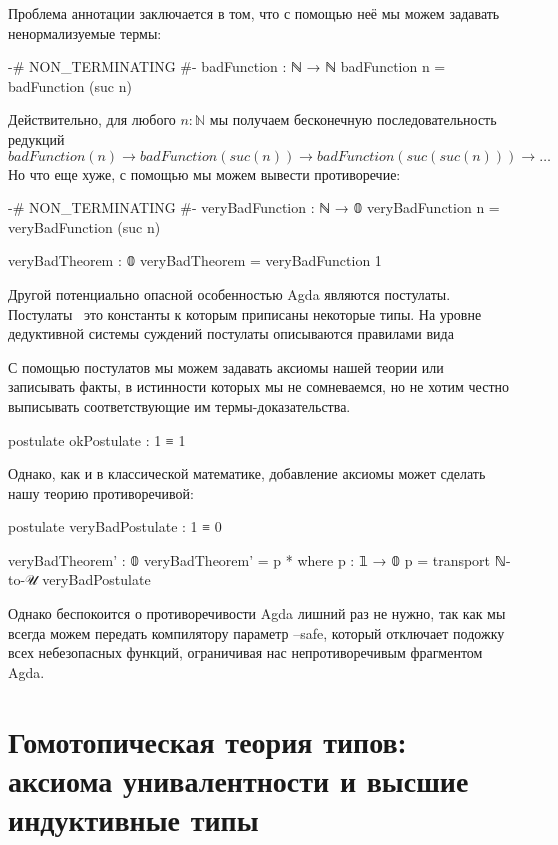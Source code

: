 \documentclass{article}[12pt]
\newcommand{\dash}{\textemdash\ }
\begin{document}
Проблема аннотации  заключается в том, что с помощью неё 
мы можем задавать ненормализуемые термы:
\begin{code}
{-# NON_TERMINATING #-}
badFunction : ℕ → ℕ
badFunction n = badFunction (suc n)
\end{code}
Действительно, для любого $n : \mathbb{N}$ мы получаем бесконечную последовательность редукций
$$badFunction(n) \rightarrow badFunction(suc(n)) \rightarrow badFunction(suc(suc(n))) \rightarrow \dots$$
Но что еще хуже, с помощью  мы можем вывести противоречие:
\begin{code}
{-# NON_TERMINATING #-}
veryBadFunction : ℕ → 𝟘
veryBadFunction n = veryBadFunction (suc n)

veryBadTheorem : 𝟘
veryBadTheorem = veryBadFunction 1
\end{code}

Другой потенциально опасной особенностью Agda являются постулаты. Постулаты \dash это константы к которым
приписаны некоторые типы. На уровне дедуктивной системы суждений постулаты описываются правилами вида
\begin{prooftree}
\end{prooftree}
С помощью постулатов мы можем задавать аксиомы нашей теории или записывать факты, в истинности которых
мы не сомневаемся, но не хотим честно выписывать соответствующие им термы-доказательства.
\begin{code}
postulate
    okPostulate : 1 ≡ 1
\end{code}

Однако, как и в классической математике, добавление аксиомы может сделать нашу теорию противоречивой:
\begin{code}
postulate
    veryBadPostulate : 1 ≡ 0

veryBadTheorem' : 𝟘
veryBadTheorem' = p *
    where
        p : 𝟙 → 𝟘
        p = transport ℕ-to-𝒰 veryBadPostulate
\end{code}

Однако беспокоится о противоречивости Agda лишний раз не нужно, так как мы всегда можем
передать компилятору параметр --safe, который отключает подожку всех небезопасных функций,
ограничивая нас непротиворечивым фрагментом Agda.

\section{Гомотопическая теория типов: аксиома унивалентности и высшие индуктивные типы}
\end{document}
